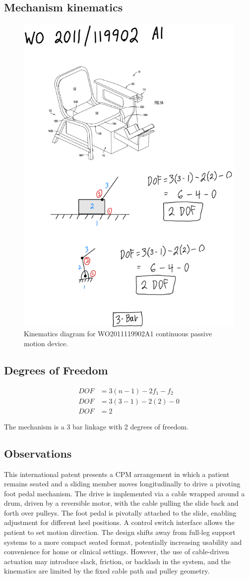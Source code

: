 \documentclass[11pt]{article}
\begin{document}
\subsection{Mechanism kinematics}
\begin{figure}[H]
  \centering
  \includegraphics[width=0.54\linewidth]{../Kinematic Mechanism Images/WO 2001_119902.png}
  \caption{Kinematics diagram for WO2011119902A1 continuous passive motion device.}
  \label{fig:WO2011119902A1_kinematics}
\end{figure}

\subsection{Degrees of Freedom}
\[
\begin{aligned}
DOF &= 3(n-1) - 2f_1 - f_2 \\
DOF &= 3(3-1) - 2(2) - 0 \\
DOF &= 2
\end{aligned}
\]

The mechanism is a 3 bar linkage with 2 degrees of freedom.

\subsection{Observations}
This international patent presents a CPM arrangement in which a patient remains seated and a sliding member moves longitudinally to drive a pivoting foot pedal mechanism. The drive is implemented via a cable wrapped around a drum, driven by a reversible motor, with the cable pulling the slide back and forth over pulleys. The foot pedal is pivotally attached to the slide, enabling adjustment for different heel positions. A control switch interface allows the patient to set motion direction. The design shifts away from full-leg support systems to a more compact seated format, potentially increasing usability and convenience for home or clinical settings. However, the use of cable-driven actuation may introduce slack, friction, or backlash in the system, and the kinematics are limited by the fixed cable path and pulley geometry.
\end{document}
